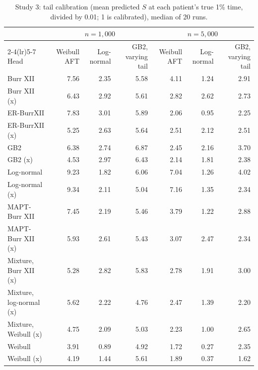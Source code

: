 \begin{table}[htbp]
\centering
\caption{Study 3: tail calibration (mean predicted $S$ at each patient's true 1\% time, divided by 0.01; 1 is calibrated), median of 20 runs.}\label{stab:network_cal}
\scriptsize
\begin{tabular}{lrrrrrr}
\toprule
& \multicolumn{3}{c}{$n = 1{,}000$} & \multicolumn{3}{c}{$n = 5{,}000$} \\
\cmidrule(lr){2-4}\cmidrule(lr){5-7}
Head & Weibull AFT & Log-normal & GB2, varying tail & Weibull AFT & Log-normal & GB2, varying tail \\
\midrule
Burr XII & 7.56 & 2.35 & 5.58 & 4.11 & 1.24 & 2.91 \\
Burr XII (x) & 6.43 & 2.92 & 5.61 & 2.82 & 2.62 & 2.73 \\
ER-BurrXII & 7.83 & 3.01 & 5.89 & 2.06 & 0.95 & 2.25 \\
ER-BurrXII (x) & 5.25 & 2.63 & 5.64 & 2.51 & 2.12 & 2.51 \\
GB2 & 6.38 & 2.74 & 6.87 & 2.45 & 2.16 & 3.70 \\
GB2 (x) & 4.53 & 2.97 & 6.43 & 2.14 & 1.81 & 2.38 \\
Log-normal & 9.23 & 1.82 & 6.06 & 7.04 & 1.26 & 4.02 \\
Log-normal (x) & 9.34 & 2.11 & 5.04 & 7.16 & 1.35 & 2.34 \\
MAPT-Burr XII & 7.45 & 2.19 & 5.46 & 3.79 & 1.22 & 2.88 \\
MAPT-Burr XII (x) & 5.93 & 2.61 & 5.43 & 3.07 & 2.47 & 2.34 \\
Mixture, Burr XII (x) & 5.28 & 2.82 & 5.83 & 2.78 & 1.91 & 3.00 \\
Mixture, log-normal (x) & 5.62 & 2.22 & 4.76 & 2.47 & 1.39 & 2.20 \\
Mixture, Weibull (x) & 4.75 & 2.09 & 5.03 & 2.23 & 1.00 & 2.65 \\
Weibull & 3.91 & 0.89 & 4.92 & 1.72 & 0.27 & 2.35 \\
Weibull (x) & 4.19 & 1.44 & 5.61 & 1.89 & 0.37 & 1.62 \\
\bottomrule
\end{tabular}

\par\vspace{0.3em}{\footnotesize (x): shape parameters predicted per patient.}
\end{table}
